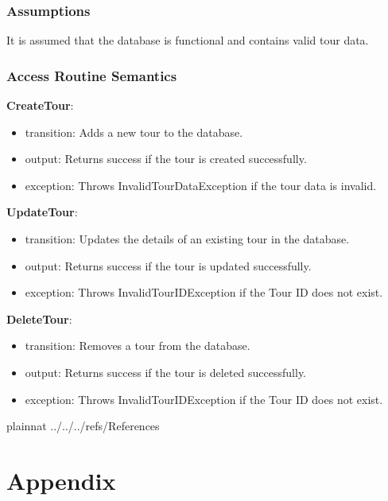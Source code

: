 \documentclass[12pt, titlepage]{article}
\begin{document}
\subsubsection{Assumptions}

It is assumed that the database is functional and contains valid tour data.

\subsubsection{Access Routine Semantics}

\noindent \textbf{CreateTour}:
\begin{itemize}
    \item transition: Adds a new tour to the database.
    \item output: Returns success if the tour is created successfully.
    \item exception: Throws InvalidTourDataException if the tour data is invalid.
\end{itemize}

\noindent \textbf{UpdateTour}:
\begin{itemize}
    \item transition: Updates the details of an existing tour in the database.
    \item output: Returns success if the tour is updated successfully.
    \item exception: Throws InvalidTourIDException if the Tour ID does not exist.
\end{itemize}

\noindent \textbf{DeleteTour}:
\begin{itemize}
    \item transition: Removes a tour from the database.
    \item output: Returns success if the tour is deleted successfully.
    \item exception: Throws InvalidTourIDException if the Tour ID does not exist.
\end{itemize}

\newpage

 {plainnat}
 {../../../refs/References}

\newpage

\section{Appendix} \label{Appendix}

\end{document}
